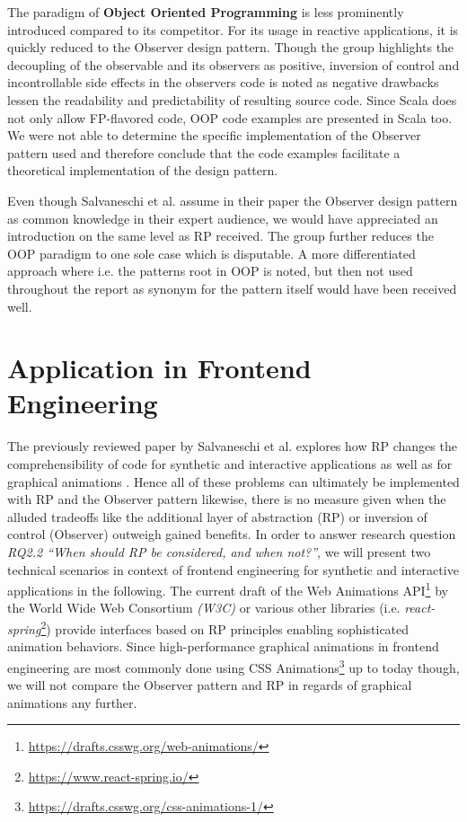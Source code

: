 \documentclass[12pt,a4paper]{article}
\begin{document}
The paradigm of \textbf{Object Oriented Programming} is less prominently introduced compared to its competitor. For its usage in reactive applications, it is quickly reduced to the Observer design pattern. Though the group highlights the decoupling of the observable and its observers as positive, inversion of control and incontrollable side effects in the observers code is noted as negative drawbacks lessen the readability and predictability of resulting source code. Since Scala does not only allow FP-flavored code, OOP code examples are presented in Scala too. We were not able to determine the specific implementation of the Observer pattern used and therefore conclude that the code examples facilitate a theoretical implementation of the design pattern.

Even though Salvaneschi et al. assume in their paper the Observer design pattern as common knowledge in their expert audience, we would have appreciated an introduction on the same level as RP received. The group further reduces the OOP paradigm to one sole case which is disputable. A more differentiated approach where i.e. the patterns root in OOP is noted, but then not used throughout the report as synonym for the pattern itself would have been received well.

\section{Application in Frontend Engineering}
\label{sec:practical-application}

The previously reviewed paper by Salvaneschi et al. explores how RP changes the comprehensibility of code for synthetic and interactive applications as well as for graphical animations \cite{7827078}. Hence all of these problems can ultimately be implemented with RP and the Observer pattern likewise, there is no measure given when the alluded tradeoffs like the additional layer of abstraction (RP) or inversion of control (Observer) outweigh gained benefits. In order to answer research question \emph{RQ2.2 ``When should RP be considered, and when not?''}, we will present two technical scenarios in context of frontend engineering for synthetic and interactive applications in the following. The current draft of the Web Animations API\footnote{\url{https://drafts.csswg.org/web-animations/}} by the World Wide Web Consortium \emph{(W3C)} or various other libraries (i.e. \emph{react-spring}\footnote{\url{https://www.react-spring.io/}}) provide interfaces based on RP principles enabling sophisticated animation behaviors. Since high-performance graphical animations in frontend engineering are most commonly done using CSS Animations\footnote{\url{https://drafts.csswg.org/css-animations-1/}} up to today though, we will not compare the Observer pattern and RP in regards of graphical animations any further.
\end{document}

